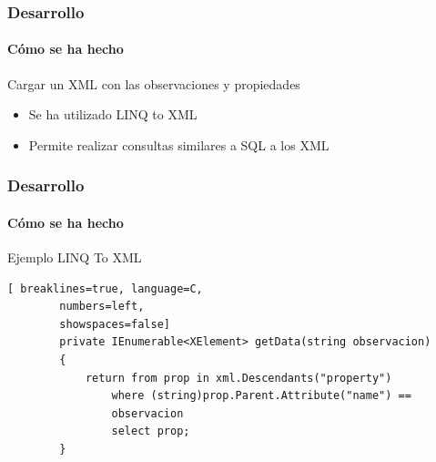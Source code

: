 \begin{frame}
    \frametitle{Desarrollo}
    \framesubtitle{C\'omo se ha hecho}
    \begin{block}{Cargar un XML con las observaciones y propiedades}
        
        \begin{itemize}
            \item Se ha utilizado LINQ to XML
            \item Permite realizar consultas similares a SQL a los XML
        \end{itemize}
        
    \end{block}
    
\end{frame}

\begin{frame}[fragile]
    \frametitle{Desarrollo}
    \framesubtitle{C\'omo se ha hecho}
    
    \begin{block}{Ejemplo LINQ To XML}
        \begin{lstlisting}[ breaklines=true, language=C, 
        numbers=left, 
        showspaces=false]
        private IEnumerable<XElement> getData(string observacion)
        {
            return from prop in xml.Descendants("property")
                where (string)prop.Parent.Attribute("name") == 
                observacion
                select prop;
        }
        \end{lstlisting}
    \end{block}
\end{frame}

